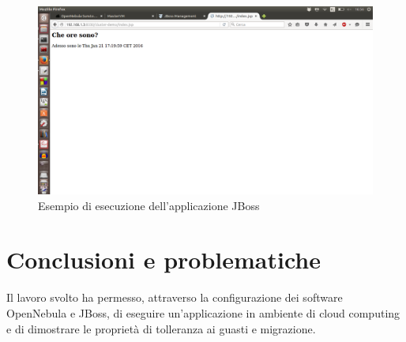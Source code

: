\documentclass[twoside]{article}
\begin{document}
\begin{figure}[!tbp]
\centering
\includegraphics[width=13cm]{immagine2.png}
\caption{Esempio di esecuzione dell'applicazione JBoss}\label{fig:2}
\end{figure}

\section{Conclusioni e problematiche}
Il lavoro svolto ha permesso, attraverso la configurazione dei software OpenNebula e JBoss, di
eseguire un'applicazione in ambiente di cloud computing e di dimostrare le proprietà di tolleranza ai guasti
e migrazione.


\printbibliography
\end{document}
